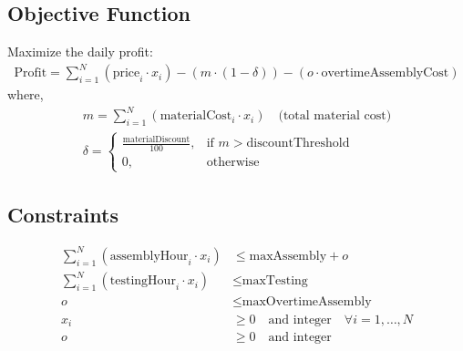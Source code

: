 \documentclass{article}
\begin{document}
\subsection*{Objective Function}
Maximize the daily profit:
\begin{align*}
\text{Profit} = \sum_{i=1}^{N} (\text{price}_i \cdot x_i) - (m \cdot (1 - \delta)) - (o \cdot \text{overtimeAssemblyCost})
\end{align*}
where,
\begin{align*}
m = \sum_{i=1}^{N} (\text{materialCost}_i \cdot x_i) \quad \text{(total material cost)} \\
\delta = 
\begin{cases} 
\frac{\text{materialDiscount}}{100}, & \text{if } m > \text{discountThreshold} \\
0, & \text{otherwise}
\end{cases}
\end{align*}

\subsection*{Constraints}
\begin{align*}
\sum_{i=1}^{N} (\text{assemblyHour}_i \cdot x_i) & \leq \text{maxAssembly} + o \\
\sum_{i=1}^{N} (\text{testingHour}_i \cdot x_i) & \leq \text{maxTesting} \\
o & \leq \text{maxOvertimeAssembly} \\
x_i & \geq 0 \quad \text{and integer} \quad \forall i = 1, \ldots, N \\
o & \geq 0 \quad \text{and integer}
\end{align*}
\end{document}
